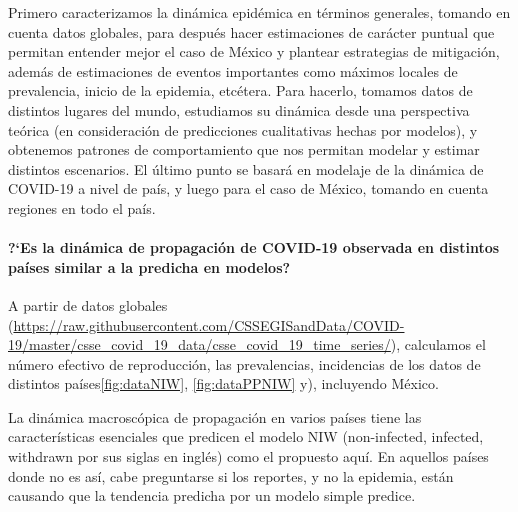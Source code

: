 \documentclass[8pt]{article}
\begin{document}
Primero caracterizamos la dinámica epidémica en términos generales, tomando en cuenta datos globales, para después hacer estimaciones de carácter puntual que permitan entender mejor el caso de México y plantear estrategias de mitigación, además de estimaciones de eventos importantes como máximos locales de prevalencia, inicio de la epidemia, etcétera. Para hacerlo, tomamos datos de distintos lugares del mundo, estudiamos su dinámica desde una perspectiva teórica (en consideración de predicciones cualitativas hechas por modelos), y obtenemos patrones de comportamiento que nos permitan modelar y estimar distintos escenarios. El último punto se basará en modelaje de la dinámica de COVID-19 a nivel de país, y luego para el caso de México, tomando en cuenta regiones en todo el país. 


\paragraph{?`Es la dinámica de propagación de COVID-19 observada en distintos países similar a la predicha en modelos?}

A partir de datos globales (\url{https://raw.githubusercontent.com/CSSEGISandData/COVID-19/master/csse_covid_19_data/csse_covid_19_time_series/}), calculamos el número efectivo de reproducción, las prevalencias, incidencias de los datos de distintos países\ref{fig:dataNIW}, \ref{fig:dataPPNIW} y), incluyendo México.

La dinámica macroscópica de propagación en varios países tiene las características esenciales que predicen el modelo NIW (non-infected, infected, withdrawn por sus siglas en inglés) como el propuesto aquí. 
En aquellos países donde no es así, cabe preguntarse si los reportes, y no la epidemia, están causando que la tendencia predicha por un modelo simple predice. 
\end{document}
